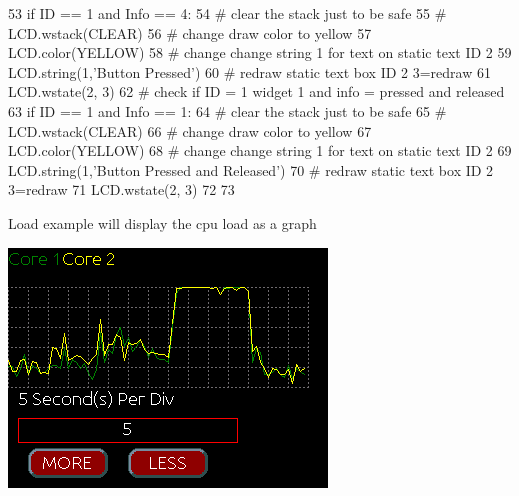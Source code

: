 \begin{DoxyCodeInclude}
53     \textcolor{keywordflow}{if} ID == 1 \textcolor{keywordflow}{and} Info == 4:
54         \textcolor{comment}{# clear the stack just to be safe}
55 \textcolor{comment}{#       LCD.wstack(CLEAR)}
56         \textcolor{comment}{# change draw color to yellow}
57         LCD.color(YELLOW)
58         \textcolor{comment}{# change change string 1 for text on static text ID 2}
59         LCD.string(1,\textcolor{stringliteral}{'Button Pressed'})
60         \textcolor{comment}{# redraw static text box ID 2 3=redraw      }
61         LCD.wstate(2, 3)
62     \textcolor{comment}{# check if ID = 1 widget 1 and info = pressed and released}
63     \textcolor{keywordflow}{if} ID == 1 \textcolor{keywordflow}{and} Info == 1:
64         \textcolor{comment}{# clear the stack just to be safe}
65 \textcolor{comment}{#       LCD.wstack(CLEAR)}
66         \textcolor{comment}{# change draw color to yellow}
67         LCD.color(YELLOW)
68         \textcolor{comment}{# change change string 1 for text on static text ID 2}
69         LCD.string(1,\textcolor{stringliteral}{'Button Pressed and Released'})
70         \textcolor{comment}{# redraw static text box ID 2 3=redraw}
71         LCD.wstate(2, 3)
72 
73         
\end{DoxyCodeInclude}
 Load example will display the cpu load as a graph \par
  
\begin{DoxyImageNoCaption}
  \mbox{\includegraphics{load.png}}
\end{DoxyImageNoCaption}
 
